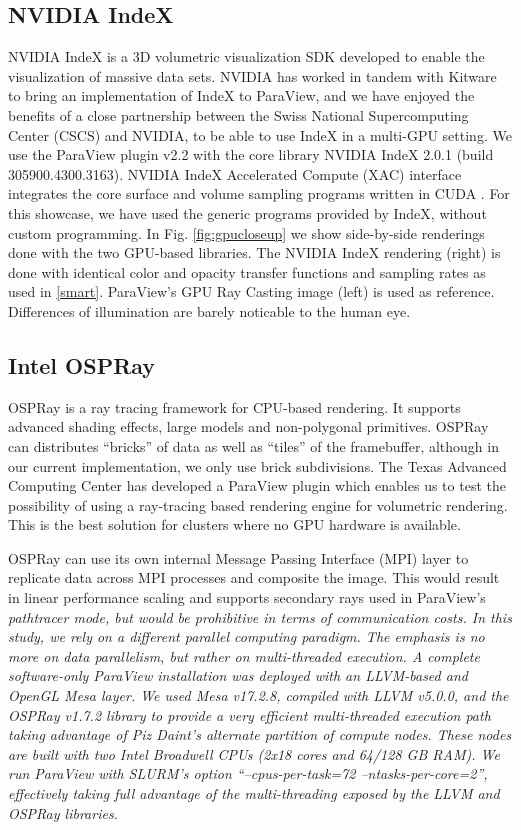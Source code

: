 \documentclass[5p,times]{elsarticle}
\begin{document}
\subsection{NVIDIA IndeX} \label{index}

NVIDIA IndeX \cite{NVIDIAIndeX} is a 3D volumetric visualization SDK developed to enable
the visualization of massive data sets. NVIDIA has worked in tandem with Kitware to
bring an implementation of IndeX to ParaView, and we have enjoyed the benefits
of a close partnership between the Swiss National Supercomputing Center (CSCS)
and NVIDIA, to be able to use IndeX in a multi-GPU setting. We use the ParaView
plugin v2.2 with the core library NVIDIA IndeX 2.0.1 (build 305900.4300.3163).
NVIDIA IndeX Accelerated Compute (XAC) interface integrates the core surface
and volume sampling programs written in CUDA \cite{SC18IndexShowcase}.
For this showcase, we have used the generic programs provided by IndeX, without custom programming.
In Fig. \ref{fig:gpucloseup} we show side-by-side renderings done with the
two GPU-based libraries. The NVIDIA IndeX rendering (right) is done with identical
color and opacity transfer functions and sampling rates as used in \ref{smart}. ParaView's
GPU Ray Casting image (left) is used as reference. Differences of
illumination are barely noticable to the human eye.

\subsection{Intel OSPRay}

OSPRay \cite{OSPRay} is a ray tracing framework for CPU-based rendering. It supports advanced 
shading effects, large models and non-polygonal primitives. OSPRay can distributes 
``bricks'' of data as well as ``tiles'' of the framebuffer, although in our current
implementation, we only use brick subdivisions. The Texas Advanced Computing Center
has developed a ParaView plugin which enables us to test the possibility of
using a ray-tracing based rendering engine for volumetric rendering. This is
the best solution for clusters where no GPU hardware is available.

OSPRay can use its own internal Message Passing Interface (MPI) layer to replicate
data across MPI processes and composite the image. This would result in linear
performance scaling and supports secondary rays used in ParaView's \it{pathtracer} \rm mode,
but would be prohibitive in terms of communication costs.
In this study, we rely on a different parallel computing paradigm.
The emphasis is no more on data parallelism, but rather on multi-threaded execution.
A complete \it{software-only} \rm ParaView installation was deployed with an LLVM-based and
OpenGL Mesa layer. We used Mesa v17.2.8, compiled with LLVM v5.0.0, and the
OSPRay v1.7.2 library to provide a very efficient multi-threaded execution path
taking advantage of Piz Daint's alternate partition of compute nodes. These nodes
are built with two Intel Broadwell CPUs (2x18 cores and 64/128 GB RAM). We run
ParaView with SLURM's option ``--cpus-per-task=72 --ntasks-per-core=2'', effectively
taking full advantage of the multi-threading exposed by the LLVM and OSPRay libraries. 
\end{document}

